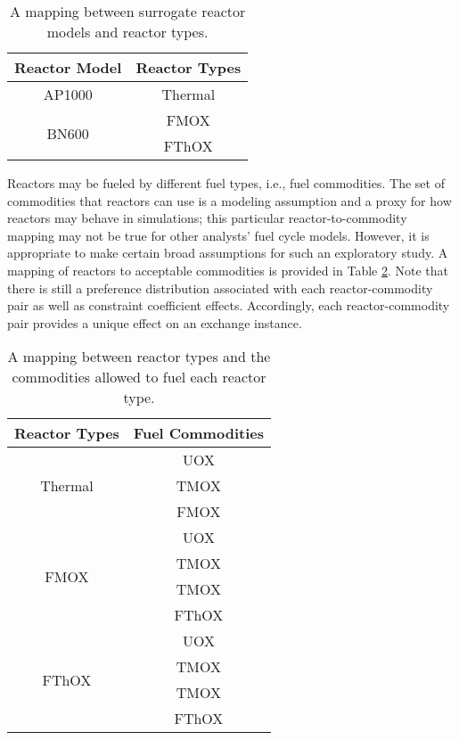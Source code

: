 \begin{table}[h!]
\centering
\caption{A mapping between surrogate reactor models and reactor types.}
\label{tbl:model_to_rxs}
\begin{tabular}{|c|c|}
\hline
\textbf{Reactor Model}            & \textbf{Reactor Types} \\ \hline
AP1000                    & Thermal         \\ \hline
\multirow{2}{*}{BN600}  & FMOX         \\  
                      & FThOX        \\ \hline
\end{tabular}
\end{table}

Reactors may be fueled by different fuel types, i.e., fuel commodities. The set
of commodities that reactors can use is a modeling assumption and a proxy for
how reactors may behave in simulations; this particular reactor-to-commodity
mapping may not be true for other analysts' fuel cycle models. However, it is
appropriate to make certain broad assumptions for such an exploratory study. A
mapping of reactors to acceptable commodities is provided in Table
\ref{tbl:rx_to_commods}. Note that there is still a preference distribution
associated with each reactor-commodity pair as well as constraint coefficient
effects. Accordingly, each reactor-commodity pair provides a unique effect on an
exchange instance.

\begin{table}[h!]
\centering
\caption{A mapping between reactor types and the commodities allowed to fuel each reactor type.}
\label{tbl:rx_to_commods}
\begin{tabular}{|c|c|}
\hline
\textbf{Reactor Types}            & \textbf{Fuel Commodities} \\ \hline
\multirow{3}{*}{Thermal}                    & UOX         \\ 
                      & TMOX        \\  
                      & FMOX       \\ \hline
\multirow{4}{*}{FMOX}  & UOX         \\  
                      & TMOX        \\ 
                      & TMOX        \\  
                      & FThOX        \\ \hline 
\multirow{4}{*}{FThOX} & UOX         \\  
                     & TMOX        \\ 
                      & TMOX        \\  
                      & FThOX        \\ \hline 
\end{tabular}
\end{table}

